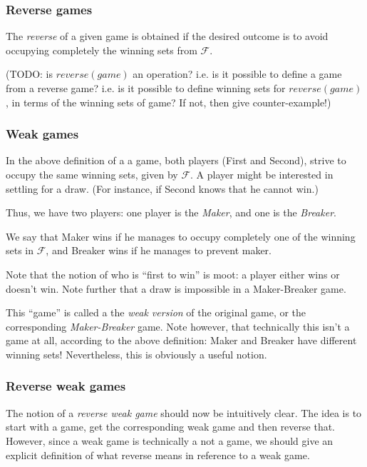 \subsubsection{Reverse games}

The \emph{reverse} of a given game is obtained if the desired outcome is to avoid occupying completely the winning sets from $\mathcal F$.

(TODO: is $reverse(game)$ an operation? i.e. is it possible to define a game from a reverse game? i.e. is it possible to define winning sets for $reverse(game)$, in terms of the winning sets of game? If not, then give counter-example!)



\subsubsection{Weak games}

In the above definition of a a game, both players (First and Second), strive to occupy the same winning sets, given by $\mathcal F$. A player might be interested in settling for a draw. (For instance, if Second knows that he cannot win.) 

Thus, we have two players: one player is the \emph{Maker}, and one is the \emph{Breaker}.

We say that Maker wins if he manages to occupy completely one of the winning sets in $\mathcal F$, and Breaker wins if he manages to prevent maker.

Note that the notion of who is ``first to win'' is moot: a player either wins or doesn't win.
Note further that a draw is impossible in a Maker-Breaker game.

This ``game'' is called a the \emph{weak version} of the original game, or the corresponding \emph{Maker-Breaker} game.
Note however, that technically this isn't a game at all, according to the above definition: Maker and Breaker have different winning sets! Nevertheless, this is obviously a useful notion.

\subsubsection{Reverse weak games}

The notion of a \emph{reverse weak game} should now be intuitively clear.
The idea is to start with a game, get the corresponding weak game and then reverse that.
However, since a weak game is technically a not a game, we should give an explicit definition of what reverse means in reference to a weak game.

